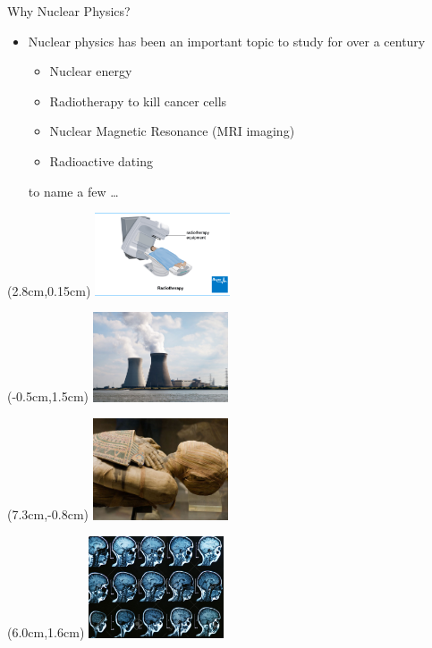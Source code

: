\documentclass{beamer}
\begin{document}
\begin{frame}[t]{Why Nuclear Physics?}
\begin{itemize}
   \item Nuclear physics has been an important topic to study for over a century
   \begin{itemize}
      \item Nuclear energy
      \item Radiotherapy to kill cancer cells
      \item Nuclear Magnetic Resonance (MRI imaging)
      \item Radioactive dating
   \end{itemize}
   to name a few \ldots
\end{itemize}
\begin{textblock*}{\textwidth}(2.8cm,0.15cm) %
   \includegraphics[width=4.0cm]{figures/radiotherapy.png}
\end{textblock*}
\begin{textblock*}{\textwidth}(-0.5cm,1.5cm) %
   \includegraphics[width=4.0cm]{figures/nuclear_energy.jpg}
\end{textblock*}
\begin{textblock*}{\textwidth}(7.3cm,-0.8cm) %
   \includegraphics[width=4.0cm]{figures/mummy.jpg}
\end{textblock*}
\begin{textblock*}{\textwidth}(6.0cm,1.6cm) %
   \includegraphics[width=4.0cm]{figures/mri.jpg}
\end{textblock*}
\end{frame}
\end{document}
